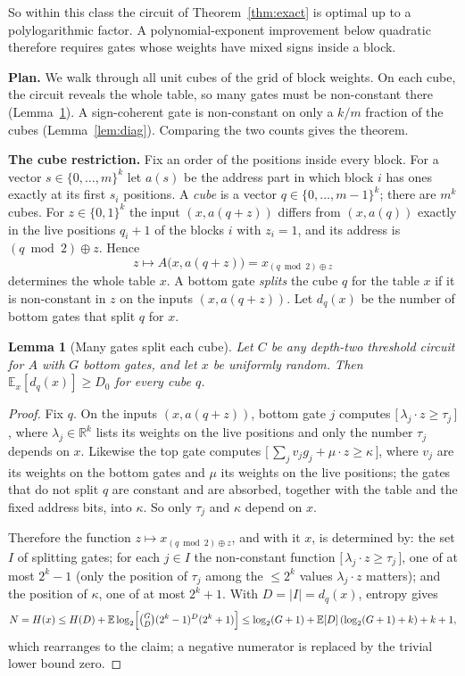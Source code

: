 \documentclass[11pt,letterpaper]{article}
\newtheorem{lemma}[theorem]{Lemma}
\theoremstyle{remark}
\newcommand{\bits}{\{0,1\}}
\newcommand{\ind}[1]{\bigl[\,#1\,\bigr]}
\newcommand{\smalltitle}[1]{\textbf{\color{ink}#1}\quad}
\begin{document}
So within this class the circuit of Theorem~\ref{thm:exact} is optimal up to a
polylogarithmic factor. A polynomial-exponent improvement below quadratic therefore requires
gates whose weights have mixed signs inside a block.

\smalltitle{Plan.}
We walk through all unit cubes of the grid of block weights. On each cube,
the circuit reveals the whole table, so many gates must be non-constant there
(Lemma~\ref{lem:entropy}). A sign-coherent gate is non-constant on only a
$k/m$ fraction of the cubes (Lemma~\ref{lem:diag}). Comparing the two counts
gives the theorem.

\smalltitle{The cube restriction.}
Fix an order of the positions inside every block. For a vector
$s\in\{0,\dots,m\}^k$ let $a(s)$ be the address part in which block $i$ has
ones exactly at its first $s_i$ positions. A \emph{cube} is a vector
$q\in\{0,\dots,m-1\}^k$; there are $m^k$ cubes. For $z\in\bits^k$ the input
$(x,a(q+z))$ differs from $(x,a(q))$ exactly in the live positions
$q_i+1$ of the blocks $i$ with $z_i=1$, and its address is
$(q\bmod2)\oplus z$. Hence
\[
z\mapsto A\bigl(x,a(q+z)\bigr)=x_{(q\bmod 2)\oplus z}
\]
determines the whole table $x$. A bottom gate \emph{splits} the cube $q$ for
the table $x$ if it is non-constant in $z$ on the inputs $(x,a(q+z))$. Let
$d_q(x)$ be the number of bottom gates that split $q$ for $x$.

\begin{lemma}[Many gates split each cube]\label{lem:entropy}
Let $C$ be any depth-two threshold circuit for $A$ with $G$ bottom gates, and
let $x$ be uniformly random. Then $\mathbb E_x[d_q(x)]\ge D_0$ for every cube
$q$.
\end{lemma}
\begin{proof}
Fix $q$. On the inputs $(x,a(q+z))$, bottom gate $j$ computes
$\ind{\lambda_j\cdot z\ge\tau_j}$, where $\lambda_j\in\mathbb R^k$ lists its
weights on the live positions and only the number $\tau_j$ depends on $x$.
Likewise the top gate computes
$\ind{\sum_jv_jg_j+\mu\cdot z\ge\kappa}$, where $v_j$ are its weights on the
bottom gates and $\mu$ its weights on the live positions; the gates that
do not split $q$ are constant and are absorbed, together with the table and
the fixed address bits, into $\kappa$. So only $\tau_j$ and $\kappa$ depend
on $x$.

Therefore the function $z\mapsto x_{(q\bmod2)\oplus z}$, and with it $x$, is
determined by: the set $I$ of splitting gates; for each $j\in I$ the
non-constant function $\ind{\lambda_j\cdot z\ge\tau_j}$, one of at most $2^k-1$
(only the position of $\tau_j$ among the $\le2^k$ values $\lambda_j\cdot z$
matters); and the position of $\kappa$, one of at most $2^k+1$. With
$D=|I|=d_q(x)$, entropy gives
\[
N=H(x)\le H(D)+\mathbb E\log_2\Bigl[\tbinom GD(2^k-1)^D(2^k+1)\Bigr]
\le\log_2(G+1)+\mathbb E[D]\,(\log_2(G+1)+k)+k+1,
\]
which rearranges to the claim; a negative numerator is replaced by the
trivial lower bound zero.
\end{proof}
\end{document}
